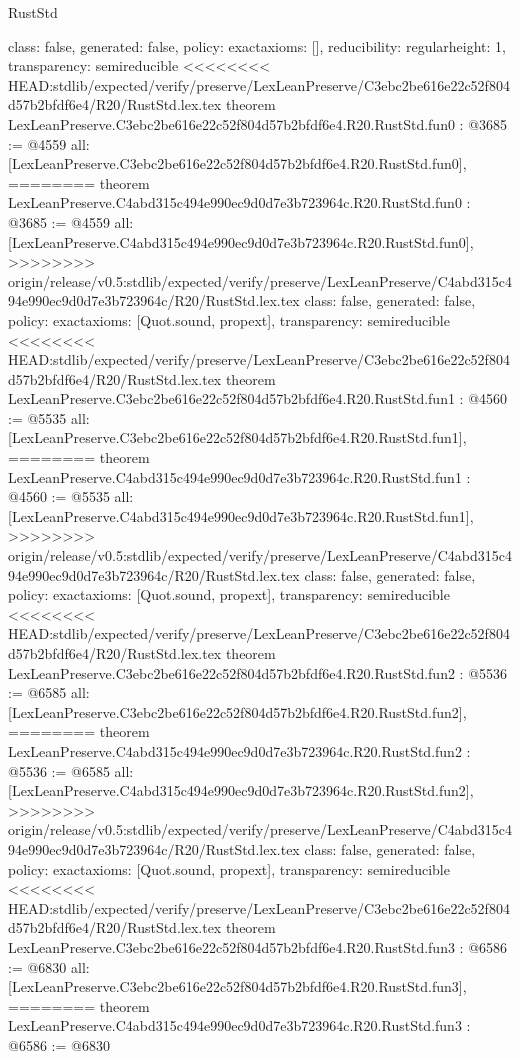 \begin{lexlean}{RustStd}
\begin{coremodule}
{\begin{coremodule}
{{{  class: false,
  generated: false,
  policy: exact{axioms: []},
  reducibility: regular{height: 1},
  transparency: semireducible
}
<<<<<<<< HEAD:stdlib/expected/verify/preserve/LexLeanPreserve/C3ebc2be616e22c52f804d57b2bfdf6e4/R20/RustStd.lex.tex
theorem LexLeanPreserve.C3ebc2be616e22c52f804d57b2bfdf6e4.R20.RustStd.fun0 : @3685 := @4559 {
  all: [LexLeanPreserve.C3ebc2be616e22c52f804d57b2bfdf6e4.R20.RustStd.fun0],
========
theorem LexLeanPreserve.C4abd315c494e990ec9d0d7e3b723964c.R20.RustStd.fun0 : @3685 := @4559 {
  all: [LexLeanPreserve.C4abd315c494e990ec9d0d7e3b723964c.R20.RustStd.fun0],
>>>>>>>> origin/release/v0.5:stdlib/expected/verify/preserve/LexLeanPreserve/C4abd315c494e990ec9d0d7e3b723964c/R20/RustStd.lex.tex
  class: false,
  generated: false,
  policy: exact{axioms: [Quot.sound, propext]},
  transparency: semireducible
}
<<<<<<<< HEAD:stdlib/expected/verify/preserve/LexLeanPreserve/C3ebc2be616e22c52f804d57b2bfdf6e4/R20/RustStd.lex.tex
theorem LexLeanPreserve.C3ebc2be616e22c52f804d57b2bfdf6e4.R20.RustStd.fun1 : @4560 := @5535 {
  all: [LexLeanPreserve.C3ebc2be616e22c52f804d57b2bfdf6e4.R20.RustStd.fun1],
========
theorem LexLeanPreserve.C4abd315c494e990ec9d0d7e3b723964c.R20.RustStd.fun1 : @4560 := @5535 {
  all: [LexLeanPreserve.C4abd315c494e990ec9d0d7e3b723964c.R20.RustStd.fun1],
>>>>>>>> origin/release/v0.5:stdlib/expected/verify/preserve/LexLeanPreserve/C4abd315c494e990ec9d0d7e3b723964c/R20/RustStd.lex.tex
  class: false,
  generated: false,
  policy: exact{axioms: [Quot.sound, propext]},
  transparency: semireducible
}
<<<<<<<< HEAD:stdlib/expected/verify/preserve/LexLeanPreserve/C3ebc2be616e22c52f804d57b2bfdf6e4/R20/RustStd.lex.tex
theorem LexLeanPreserve.C3ebc2be616e22c52f804d57b2bfdf6e4.R20.RustStd.fun2 : @5536 := @6585 {
  all: [LexLeanPreserve.C3ebc2be616e22c52f804d57b2bfdf6e4.R20.RustStd.fun2],
========
theorem LexLeanPreserve.C4abd315c494e990ec9d0d7e3b723964c.R20.RustStd.fun2 : @5536 := @6585 {
  all: [LexLeanPreserve.C4abd315c494e990ec9d0d7e3b723964c.R20.RustStd.fun2],
>>>>>>>> origin/release/v0.5:stdlib/expected/verify/preserve/LexLeanPreserve/C4abd315c494e990ec9d0d7e3b723964c/R20/RustStd.lex.tex
  class: false,
  generated: false,
  policy: exact{axioms: [Quot.sound, propext]},
  transparency: semireducible
}
<<<<<<<< HEAD:stdlib/expected/verify/preserve/LexLeanPreserve/C3ebc2be616e22c52f804d57b2bfdf6e4/R20/RustStd.lex.tex
theorem LexLeanPreserve.C3ebc2be616e22c52f804d57b2bfdf6e4.R20.RustStd.fun3 : @6586 := @6830 {
  all: [LexLeanPreserve.C3ebc2be616e22c52f804d57b2bfdf6e4.R20.RustStd.fun3],
========
theorem LexLeanPreserve.C4abd315c494e990ec9d0d7e3b723964c.R20.RustStd.fun3 : @6586 := @6830 {
}}}}}}}
\end{coremodule}}
\end{coremodule}
\end{lexlean}
